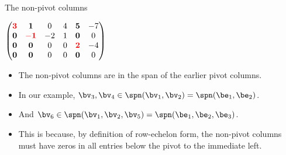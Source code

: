 \documentclass{beamer}
\begin{document}
\begin{frame}{The non-pivot columns}

$
\begin{pmatrix}
\textcolor{red}{\mathbf{3}} & \mathbf{1}                   &  0  & 4 & \mathbf{5}                  & -7 \\
\mathbf{0}                  & \textcolor{red}{\mathbf{-1}} & -2  & 1 & \mathbf{0}                  & 0  \\
\mathbf{0}                  & \mathbf{0}                   &  0  & 0 & \textcolor{red}{\mathbf{2}} & -4 \\
\mathbf{0}                  & \mathbf{0}                   &  0  & 0 & \mathbf{0}                  & 0  \\
\end{pmatrix}
$
\begin{itemize}
\item The non-pivot columns are in the span of the earlier pivot columns.
\item In our example, $\bv_3,\bv_4\in\spn(\bv_1,\bv_2) = \spn(\be_1,\be_2)$.
\item And $\bv_6\in\spn(\bv_1,\bv_2,\bv_5) = \spn(\be_1,\be_2,\be_3)$.
\item This is because, by definition of row-echelon form, the non-pivot columns must have zeros
in all entries below the pivot to the immediate left.
\end{itemize}

\end{frame}

\end{document}
